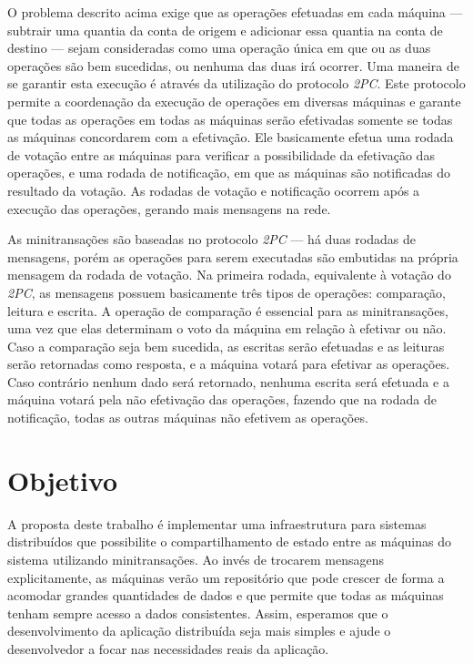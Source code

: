 \documentclass[11pt,twoside,a4paper]{book}
\begin{document}
O problema descrito acima exige que as operações efetuadas em cada máquina --- subtrair uma quantia da conta de origem e adicionar essa quantia na conta de destino --- sejam consideradas como uma operação única em que ou as duas operações são bem sucedidas, ou nenhuma das duas irá ocorrer. Uma maneira de se garantir esta execução é através da utilização do protocolo \emph{2PC}. Este protocolo permite a coordenação da execução de operações em diversas máquinas e garante que todas as operações em todas as máquinas serão efetivadas somente se todas as máquinas concordarem com a efetivação. Ele basicamente efetua uma rodada de votação entre as máquinas para verificar a possibilidade da efetivação das operações, e uma rodada de notificação, em que as máquinas são notificadas do resultado da votação. As rodadas de votação e notificação ocorrem após a execução das operações, gerando mais mensagens na rede.

As minitransações são baseadas no protocolo \emph{2PC} --- há duas rodadas de mensagens, porém as operações para serem executadas são embutidas na própria mensagem da rodada de votação. Na primeira rodada, equivalente à votação do \emph{2PC}, as mensagens possuem basicamente três tipos de operações: comparação, leitura e escrita. A operação de comparação é essencial para as minitransações, uma vez que elas determinam o voto da máquina em relação à efetivar ou não. Caso a comparação seja bem sucedida, as escritas serão efetuadas e as leituras serão retornadas como resposta, e a máquina votará para efetivar as operações. Caso contrário nenhum dado será retornado, nenhuma escrita será efetuada e a máquina votará pela não efetivação das operações, fazendo que na rodada de notificação, todas as outras máquinas não efetivem as operações.

\section{Objetivo}
\label{sec:objetivo}
A proposta deste trabalho é implementar uma infraestrutura para sistemas distribuídos que possibilite o compartilhamento de estado entre as máquinas do sistema utilizando minitransações. Ao invés de trocarem mensagens explicitamente, as máquinas verão um repositório que pode crescer de forma a acomodar grandes quantidades de dados e que permite que todas as máquinas tenham sempre acesso a dados consistentes. Assim, esperamos que o desenvolvimento da aplicação distribuída seja mais simples e ajude o desenvolvedor a focar nas necessidades reais da aplicação.
\end{document}
